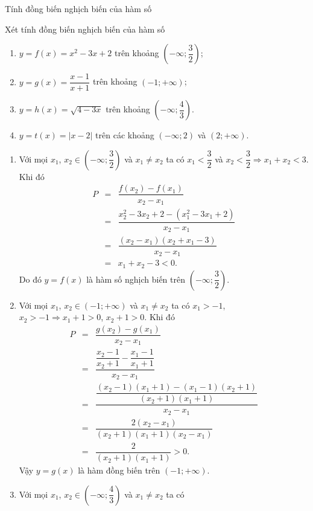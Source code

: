 \begin{dang}{Tính đồng biến nghịch biến của hàm số}
	
\end{dang}
\viduminhhoa
\begin{vd}%
	Xét tính đồng biến nghịch biến của hàm số
	\begin{enumerate}
		\item $y=f(x)=x^2-3x+2$ trên khoảng $\left(-\infty;
		\dfrac{3}{2}\right)$;
		\item $y=g(x)=\dfrac{x-1}{x+1}$ trên khoảng $(-1;+\infty)$;
		\item $y=h(x)=\sqrt{4-3x}$ trên khoảng $\left(-\infty;\dfrac{4}{3}\right)$.
		\item $y=t(x)=|x-2|$ trên các khoảng $(-\infty;2)$ và $(2;+\infty)$.
	\end{enumerate}
	\loigiai
	{
		\begin{enumerate}
			\item Với mọi $x_1$, $x_2\in \left(-\infty;
			\dfrac{3}{2}\right)$ và $x_1\neq x_2$ ta có $x_1<\dfrac{3}{2}$ và $x_2<\dfrac{3}{2}\Rightarrow x_1+x_2<3$. Khi đó
			\begin{eqnarray*}
				P&=&\dfrac{f(x_2)-f(x_1)}{x_2-x_1}\\
				&=&\dfrac{x_2^2-3x_2+2-(x_1^2-3x_1+2)}{x_2-x_1}\\
				&=&\dfrac{(x_2-x_1)(x_2+x_1-3)}{x_2-x_1}\\
				&=&x_1+x_2-3<0.
			\end{eqnarray*}
			Do đó $y=f(x)$ là hàm số nghịch biến trên $\left(-\infty;\dfrac{3}{2}\right)$.
			\item Với mọi $x_1$, $x_2\in (-1;+\infty)$ và $x_1\neq x_2$ ta có $x_1>-1$, $x_2>-1\Rightarrow x_1+1>0$, $x_2+1>0$. Khi đó
			\begin{eqnarray*}
				P&=&\dfrac{g(x_2)-g(x_1)}{x_2-x_1}\\
				&=&\dfrac{\dfrac{x_2-1}{x_2+1}-\dfrac{x_1-1}{x_1+1}}{x_2-x_1}\\
				&=&\dfrac{\dfrac{(x_2-1)(x_1+1)-(x_1-1)(x_2+1)}{(x_2+1)(x_1+1)}}{x_2-x_1}\\
				&=&\dfrac{2(x_2-x_1)}{(x_2+1)(x_1+1)(x_2-x_1)}\\
				&=&\dfrac{2}{(x_2+1)(x_1+1)}>0.
			\end{eqnarray*} 
			Vậy $y=g(x)$ là hàm đồng biến trên $(-1;+\infty)$.
			\item Với mọi $x_1$, $x_2\in \left(-\infty;\dfrac{4}{3}\right)$ và $x_1\neq x_2$ ta có
			\begin{eqnarray*}

\end{eqnarray*}
\end{enumerate}}
\end{vd}
